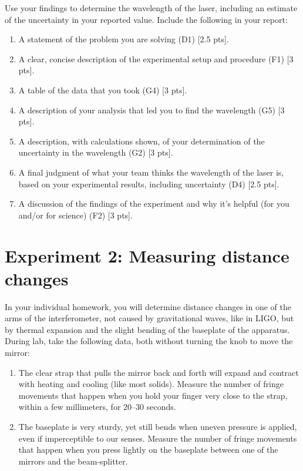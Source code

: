Use your findings to determine the wavelength of the laser, including an estimate of the uncertainty in your reported value. Include the following in your report:
\begin{enumerate}
	\item A statement of the problem you are solving (D1) [2.5 pts].
	
	\item A clear, concise description of the experimental setup and procedure (F1) [3 pts].
	
	\item A table of the data that you took (G4) [3 pts].
	
	\item A description of your analysis that led you to find the wavelength (G5) [3 pts].
	
	\item A description, with calculations shown, of your determination of the uncertainty in the wavelength (G2) [3 pts].
	
	\item A final judgment of what your team thinks the wavelength of the laser is, based on your experimental results, including uncertainty (D4) [2.5 pts].
	
	\item A discussion of the findings of the experiment and why it's helpful (for you and/or for science) (F2) [3 pts].
\end{enumerate}

\section{Experiment 2: Measuring distance changes}

In your individual homework, you will determine distance changes in one of the arms of the interferometer, not caused by gravitational waves, like in LIGO, but by thermal expansion and the slight bending of the baseplate of the apparatus. During lab, take the following data, both without turning the knob to move the mirror:

\begin{enumerate}
	\item The clear strap that pulls the mirror back and forth will expand and contract with heating and cooling (like most solids). Measure the number of fringe movements that happen when you hold your finger very close to the strap, within a few millimeters, for 20--30 seconds.
	
	\item The baseplate is very sturdy, yet still bends when uneven pressure is applied, even if imperceptible to our senses. Measure the number of fringe movements that happen when you press lightly on the baseplate between one of the mirrors and the beam-splitter.
\end{enumerate}

